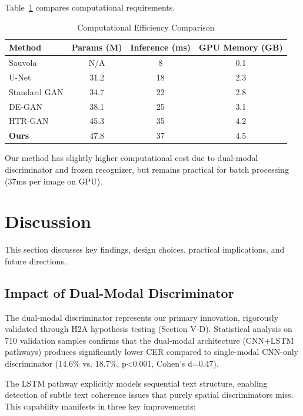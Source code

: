 \documentclass[journal]{IEEEtran}
\begin{document}
Table~\ref{table_efficiency} compares computational requirements.

\begin{table}[!t]
\renewcommand{\arraystretch}{1.3}
\caption{Computational Efficiency Comparison}
\label{table_efficiency}
\centering
\begin{tabular}{|l|c|c|c|}
\hline
\textbf{Method} & \textbf{Params (M)} & \textbf{Inference (ms)} & \textbf{GPU Memory (GB)} \\
\hline
Sauvola & N/A & 8 & 0.1 \\
U-Net & 31.2 & 18 & 2.3 \\
Standard GAN & 34.7 & 22 & 2.8 \\
DE-GAN & 38.1 & 25 & 3.1 \\
HTR-GAN & 45.3 & 35 & 4.2 \\
\textbf{Ours} & 47.8 & 37 & 4.5 \\
\hline
\end{tabular}
\end{table}

Our method has slightly higher computational cost due to dual-modal discriminator and frozen recognizer, but remains practical for batch processing (37ms per image on GPU).

\section{Discussion}

This section discusses key findings, design choices, practical implications, and future directions.

\subsection{Impact of Dual-Modal Discriminator}

The dual-modal discriminator represents our primary innovation, rigorously validated through H2A hypothesis testing (Section V-D). Statistical analysis on 710 validation samples confirms that the dual-modal architecture (CNN+LSTM pathways) produces significantly lower CER compared to single-modal CNN-only discriminator (14.6\% vs. 18.7\%, p<0.001, Cohen's d=0.47).

The LSTM pathway explicitly models sequential text structure, enabling detection of subtle text coherence issues that purely spatial discriminators miss. This capability manifests in three key improvements:
\end{document}
